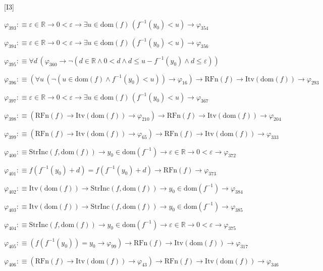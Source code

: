 \begin{fullproof}{[I3]}
\begin{abbrevlist}
\item $\varphi_{393} :\equiv \varepsilon \in \mathbb{R} \to 0 < \varepsilon \to \exists u \in \mathrm{dom}(f)\,(f^{-1}(y_{0}) < u) \to \varphi_{354}$
\item $\varphi_{394} :\equiv \varepsilon \in \mathbb{R} \to 0 < \varepsilon \to \exists u \in \mathrm{dom}(f)\,(f^{-1}(y_{0}) < u) \to \varphi_{356}$
\item $\varphi_{395} :\equiv \forall d\,(\varphi_{360} \to \neg (d \in \mathbb{R} \land 0 < d \land d \leq u - f^{-1}(y_{0}) \land d \leq \varepsilon))$
\item $\varphi_{396} :\equiv (\forall u\,(\neg (u \in \mathrm{dom}(f) \land f^{-1}(y_{0}) < u)) \to \varphi_{16}) \to \mathrm{RFn}(f) \to \mathrm{Itv}(\mathrm{dom}(f)) \to \varphi_{293}$
\item $\varphi_{397} :\equiv \varepsilon \in \mathbb{R} \to 0 < \varepsilon \to \exists u \in \mathrm{dom}(f)\,(f^{-1}(y_{0}) < u) \to \varphi_{367}$
\item $\varphi_{398} :\equiv (\mathrm{RFn}(f) \to \mathrm{Itv}(\mathrm{dom}(f)) \to \varphi_{210}) \to \mathrm{RFn}(f) \to \mathrm{Itv}(\mathrm{dom}(f)) \to \varphi_{204}$
\item $\varphi_{399} :\equiv (\mathrm{RFn}(f) \to \mathrm{Itv}(\mathrm{dom}(f)) \to \varphi_{65}) \to \mathrm{RFn}(f) \to \mathrm{Itv}(\mathrm{dom}(f)) \to \varphi_{333}$
\item $\varphi_{400} :\equiv \mathrm{StrInc}(f,\mathrm{dom}(f)) \to y_{0} \in \mathrm{dom}(f^{-1}) \to \varepsilon \in \mathbb{R} \to 0 < \varepsilon \to \varphi_{372}$
\item $\varphi_{401} :\equiv f(f^{-1}(y_{0}) + d) = f(f^{-1}(y_{0}) + d) \to \mathrm{RFn}(f) \to \varphi_{373}$
\item $\varphi_{402} :\equiv \mathrm{Itv}(\mathrm{dom}(f)) \to \mathrm{StrInc}(f,\mathrm{dom}(f)) \to y_{0} \in \mathrm{dom}(f^{-1}) \to \varphi_{384}$
\item $\varphi_{403} :\equiv \mathrm{Itv}(\mathrm{dom}(f)) \to \mathrm{StrInc}(f,\mathrm{dom}(f)) \to y_{0} \in \mathrm{dom}(f^{-1}) \to \varphi_{385}$
\item $\varphi_{404} :\equiv \mathrm{StrInc}(f,\mathrm{dom}(f)) \to y_{0} \in \mathrm{dom}(f^{-1}) \to \varepsilon \in \mathbb{R} \to 0 < \varepsilon \to \varphi_{375}$
\item $\varphi_{405} :\equiv (f(f^{-1}(y_{0})) = y_{0} \to \varphi_{99}) \to \mathrm{RFn}(f) \to \mathrm{Itv}(\mathrm{dom}(f)) \to \varphi_{317}$
\item $\varphi_{406} :\equiv (\mathrm{RFn}(f) \to \mathrm{Itv}(\mathrm{dom}(f)) \to \varphi_{43}) \to \mathrm{RFn}(f) \to \mathrm{Itv}(\mathrm{dom}(f)) \to \varphi_{346}$

\end{abbrevlist}
\end{fullproof}
